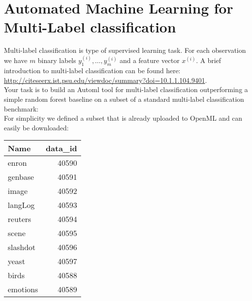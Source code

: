 \documentclass[10pt,a4paper]{article}
\begin{document}
\tfp

	\section*{Automated Machine Learning for Multi-Label classification}

        Multi-label classification is type of supervised learning task.
        For each observation we have $m$ binary labels $y^{(i)}_1, \dots, y^{(i)}_m$ and a feature vector $x^{(i)}$.
        A brief introduction to multi-label classification can be found here:\\
		\url{http://citeseerx.ist.psu.edu/viewdoc/summary?doi=10.1.1.104.9401}.
		\\
		Your task is to build an Automl tool for multi-label classification outperforming a simple random forest baseline on a subset of a standard multi-label classification benchmark:\\

		For simplicity we defined a subset that is already uploaded to OpenML and can easily be downloaded:
		\begin{center}
			\begin{tabular}{lr}
				Name & data\_id \\
				\hline
				enron & 40590 \\
				genbase & 40591 \\
				image & 40592 \\
				langLog & 40593 \\
				reuters & 40594 \\
				scene & 40595 \\
				slashdot & 40596 \\
				yeast & 40597 \\
				birds & 40588 \\
				emotions & 40589
			\end{tabular}
		\end{center}
\end{document}
